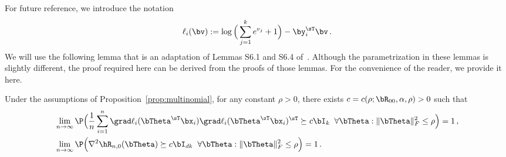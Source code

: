 For future reference, we  introduce the notation
%
\begin{align}
\ell_{i}(\bv):=
   \log\Big( \sum_{j=1}^k e^{v_j} + 1\Big)  
   -  \by_{i}^\sT \bv\, .\label{eq:ell_i}
\end{align}
%
We will use the following lemma that is 
an adaptation of Lemmas S6.1 and S6.4 of~\cite{tan2024multinomial}.
Although the parametrization in these lemmas is slightly different,
the proof required here can be derived from the proofs of those lemmas. For the convenience of the reader, we provide it here.
\begin{lemma}\label{lemma:LocalStrongMultinomial}
Under the assumptions of Proposition~\ref{prop:multinomial}, for any constant
$\rho>0$, there exists $c = c(\rho;\bR_{00},\alpha,\rho)>0$ such that
%
\begin{align}
&   \lim_{n\to\infty}\P\Big(\frac1n\sum_{i=1}^n \grad\ell_{i}(\bTheta^\sT\bx_i) 
    \grad\ell_{i}(\bTheta^\sT\bx_i)^\sT \succeq c\bI_k
    \;\;\forall \bTheta:\|\bTheta\|_F^2\le \rho\Big) = 1\,,
    \label{eq:outer_prod_singular_value_lb}\\
&\lim_{n\to\infty}\P\Big(\nabla^2 \hR_{n,0}(\bTheta)\succeq c\bI_{dk}\;\;\forall \bTheta:\|\bTheta\|_F^2\le \rho\Big) = 1\,.
\label{eq:hessian_singular_value_lb_multinomial}
\end{align}
\end{lemma}
